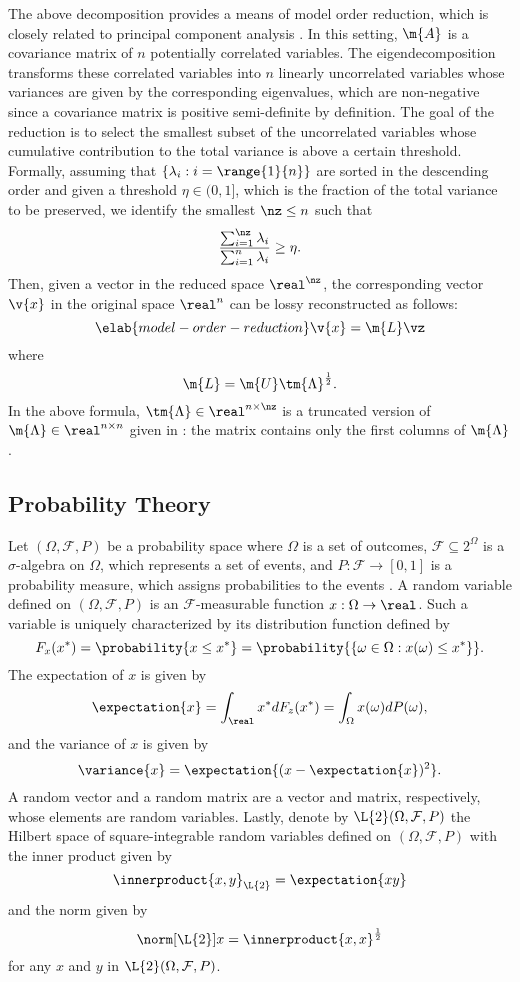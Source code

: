 The above decomposition provides a means of model order reduction, which is
closely related to principal component analysis \cite{hastie2013}. In this
setting, $\m{A}$ is a covariance matrix of $n$ potentially correlated variables.
The eigendecomposition transforms these correlated variables into $n$ linearly
uncorrelated variables whose variances are given by the corresponding
eigenvalues, which are non-negative since a covariance matrix is positive
semi-definite by definition. The goal of the reduction is to select the smallest
subset of the uncorrelated variables whose cumulative contribution to the total
variance is above a certain threshold. Formally, assuming that $\{ \lambda_i: i
= \range{1}{n} \}$ are sorted in the descending order and given a threshold
$\eta \in (0, 1]$, which is the fraction of the total variance to be preserved,
we identify the smallest $\nz \leq n$ such that
\[
  \frac{\sum_{i = 1}^\nz \lambda_i}{\sum_{i = 1}^n \lambda_i} \geq \eta.
\]
Then, given a vector \vz in the reduced space $\real^\nz$, the corresponding
vector $\v{x}$ in the original space $\real^n$ can be lossy reconstructed as
follows:
\begin{equation} \elab{model-order-reduction}
  \v{x} = \m{L} \vz
\end{equation}
where
\[
  \m{L} = \m{U} \tm{\Lambda}^\frac{1}{2}.
\]
In the above formula, $\tm{\Lambda} \in \real^{n \times \nz}$ is a truncated
version of $\m{\Lambda} \in \real^{n \times n}$ given in
: the matrix contains only the first \nz columns of
$\m{\Lambda}$.

\subsection{Probability Theory}

Let $(\Omega, \mathcal{F}, P)$ be a probability space where $\Omega$ is a set of
outcomes, $\mathcal{F} \subseteq 2^\Omega$ is a $\sigma$-algebra on $\Omega$,
which represents a set of events, and $P: \mathcal{F} \to [0, 1]$ is a
probability measure, which assigns probabilities to the events
\cite{durrett2010}. A random variable defined on $(\Omega, \mathcal{F}, P)$ is
an $\mathcal{F}$-measurable function $x: \Omega \to \real$. Such a variable is
uniquely characterized by its distribution function defined by
\begin{equation*}
  F_x(x^*) = \probability{x \leq x^*} = \probability{\{ \omega \in \Omega: x(\omega) \leq x^* \}}.
\end{equation*}
The expectation of $x$ is given by
\[
  \expectation{x} = \int_\real x^* dF_z(x^*) = \int_\Omega x(\omega) dP(\omega),
\]
and the variance of $x$ is given by
\[
  \variance{x} = \expectation{(x - \expectation{x})^2}.
\]
A random vector and a random matrix are a vector and matrix, respectively, whose
elements are random variables. Lastly, denote by $\L{2}(\Omega, \mathcal{F}, P)$
the Hilbert space of square-integrable random variables \cite{janson1997}
defined on $(\Omega, \mathcal{F}, P)$ with the inner product given by
\[
  \innerproduct{x, y}_\L{2} = \expectation{x y}
\]
and the norm given by
\[
  \norm[\L{2}]{x} = \innerproduct{x, x}^\frac{1}{2}
\]
for any $x$ and $y$ in $\L{2}(\Omega, \mathcal{F}, P)$.

